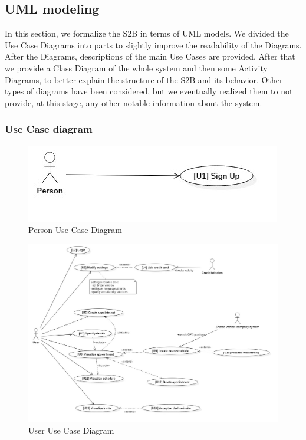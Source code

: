 \subsection{UML modeling}
	In this section, we formalize the S2B in terms of UML models.\newline
	We divided the Use Case Diagrams into parts to slightly improve the readability of the Diagrams. After the Diagrams, descriptions of the main Use Cases are provided.\newline
	After that we provide a Class Diagram of the whole system and then some Activity Diagrams, to better explain the structure of the S2B and its behavior.\newline
	Other types of diagrams have been considered, but we eventually realized them to not provide, at this stage, any other notable information about the system.
	\subsubsection{Use Case diagram}
		\smallskip
		\begin{figure}[H]	
			\centerline{\includegraphics[scale= 0.7]{Images/UseCaseDiagram0}}
			\caption{Person Use Case Diagram}
		\end{figure}
		\begin{figure}[H]	
			\centerline{\includegraphics[width=\paperwidth~]{Images/UseCaseDiagram1}}
			\caption{User Use Case Diagram}
		\end{figure}

